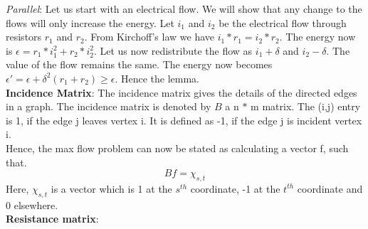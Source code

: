\documentclass[a4paper,10pt]{article}
\newcommand{\eps}{\epsilon}
\begin{document}
	\textit{Parallel}:  Let us start with an electrical flow. We will show that any change to the flows will only increase the energy.
	Let $i_1$ and $i_2$ be the electrical flow through resistors $r_1$ and $r_2$. From Kirchoff's law we have $i_1 \ast r_1 = i_2 \ast r_2 $.
	The energy now is $\eps = r_1  \ast i_1^2 + r_2 \ast i_2^2$. Let us now redistribute the flow as $i_1 + \delta$ and $i_2 - \delta$. 
	The value of the flow remains the same. The energy now becomes $\eps' = \eps + \delta^2(r_1+r_2) \geq \eps$. Hence the lemma. \\
	
	\textbf{Incidence Matrix}: The incidence matrix gives the details of the directed edges in a graph. The incidence matrix is denoted
	by $B$ a n $\ast$ m matrix. The (i,j) entry is 1, if the edge j leaves vertex i. It is defined as -1, if the edge j is incident 
	vertex i. \\
	
	Hence, the max flow problem can now be stated as calculating a vector f, such that.
	$$Bf = \chi_{s,t}$$
	Here, $\chi_{s,t}$ is a vector which is 1 at the $s^{th}$ coordinate, -1 at the $t^{th}$ coordinate and 0 elsewhere. \\
	
	\textbf{Resistance matrix}:
	   
	    
	
	
      
 
  
  
   
\end{document}
